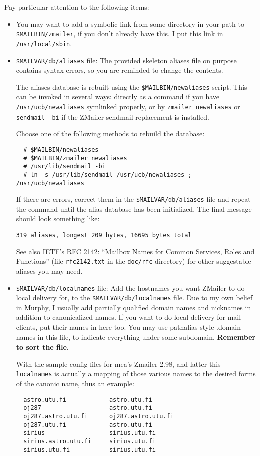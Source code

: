 Pay particular attention to the following items:
\begin{itemize}
\item You may want to add a symbolic link from some directory in your path
to {\tt \$MAILBIN/zmailer}, if you don't already have this.  I put this link
in {\tt /usr/local/sbin}.
\item {\tt \$MAILVAR/db/aliases} file:  The provided skeleton aliases file on purpose contains syntax errors,
so you are reminded to change the contents.

The aliases database is rebuilt using the {\tt \$MAILBIN/newaliases} script.
This can be invoked in several ways: directly as a command if you
have {\tt /usr/ucb/newaliases} symlinked properly, or by {\tt zmailer newaliases}
or {\tt sendmail -bi} if the ZMailer sendmail replacement is installed.

Choose one of the following methods to rebuild the database:
\begin{verbatim}
  # $MAILBIN/newaliases
  # $MAILBIN/zmailer newaliases
  # /usr/lib/sendmail -bi
  # ln -s /usr/lib/sendmail /usr/ucb/newaliases ; /usr/ucb/newaliases
\end{verbatim}

If there are errors, correct them in the {\tt \$MAILVAR/db/aliases} file
and repeat the command until the alias database has been initialized.
The final message should look something like:
\begin{verbatim}
319 aliases, longest 209 bytes, 16695 bytes total
\end{verbatim}

See also IETF's RFC 2142: ``Mailbox Names for Common Services, Roles and
Functions'' (file {\tt rfc2142.txt} in the {\tt doc/rfc} directory) 
for other suggestable aliases you may need. 
                                                               
\item {\tt \$MAILVAR/db/localnames} file: Add the hostnames you want ZMailer to do local delivery for, to the
{\tt \$MAILVAR/db/localnames} file.  Due to my own belief in Murphy,
I usually add partially qualified domain names and nicknames in
addition to canonicalized names.  If you want to do local delivery
for mail clients, put their names in here too.  You may use pathalias 
style .domain names in this file, to indicate everything under some
subdomain. {\bf Remember to sort the file.}

With the sample config files for mea's Zmailer-2.98, and latter
this {\tt localnames} is actually a mapping of those various names to
the desired forms of the canonic name, thus an example:
\begin{verbatim}
  astro.utu.fi            astro.utu.fi
  oj287                   astro.utu.fi
  oj287.astro.utu.fi      oj287.astro.utu.fi
  oj287.utu.fi            astro.utu.fi
  sirius                  sirius.utu.fi
  sirius.astro.utu.fi     sirius.utu.fi
  sirius.utu.fi           sirius.utu.fi
\end{verbatim}


\end{itemize}
